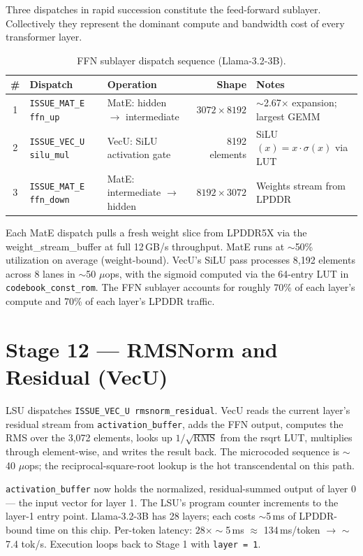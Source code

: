 \documentclass[11pt,letterpaper]{article}
\begin{document}
Three dispatches in rapid succession constitute the feed-forward sublayer. Collectively they
represent the dominant compute and bandwidth cost of every transformer layer.

\begin{table}[h!]
\centering
\small
\begin{tabular}{@{}c l l r p{5cm}@{}}
\toprule
\textbf{\#} & \textbf{Dispatch} & \textbf{Operation} & \textbf{Shape} & \textbf{Notes} \\
\midrule
1 & \texttt{ISSUE\_MAT\_E ffn\_up}   & MatE: hidden $\to$ intermediate & $3072 \times 8192$ & $\sim$2.67$\times$ expansion; largest GEMM \\
2 & \texttt{ISSUE\_VEC\_U silu\_mul} & VecU: SiLU activation gate      & 8192 elements      & SiLU$(x) = x \cdot \sigma(x)$ via LUT \\
3 & \texttt{ISSUE\_MAT\_E ffn\_down} & MatE: intermediate $\to$ hidden & $8192 \times 3072$ & Weights stream from LPDDR \\
\bottomrule
\end{tabular}
\caption{FFN sublayer dispatch sequence (Llama-3.2-3B).}
\end{table}

Each MatE dispatch pulls a fresh weight slice from LPDDR5X via the weight\_stream\_buffer at
full 12\,GB/s throughput. MatE runs at $\sim$50\% utilization on average (weight-bound).
VecU's SiLU pass processes 8{,}192 elements across 8 lanes in $\sim$50 $\mu$ops, with the
sigmoid computed via the 64-entry LUT in \texttt{codebook\_const\_rom}. The FFN sublayer
accounts for roughly 70\% of each layer's compute and 70\% of each layer's LPDDR traffic.

\section{Stage 12 --- RMSNorm and Residual (VecU)}

LSU dispatches \texttt{ISSUE\_VEC\_U rmsnorm\_residual}. VecU reads the current layer's
residual stream from \texttt{activation\_buffer}, adds the FFN output, computes the RMS over
the 3{,}072 elements, looks up $1/\sqrt{\text{RMS}}$ from the rsqrt LUT, multiplies through
element-wise, and writes the result back. The microcoded sequence is $\sim$40 $\mu$ops; the
reciprocal-square-root lookup is the hot transcendental on this path.

\texttt{activation\_buffer} now holds the normalized, residual-summed output of layer 0 ---
the input vector for layer 1. The LSU's program counter increments to the layer-1 entry
point. Llama-3.2-3B has 28 layers; each costs $\sim$5\,ms of LPDDR-bound time on this chip.
Per-token latency: $28 \times \sim$5\,ms $\approx$ 134\,ms/token $\to$ $\sim$7.4 tok/s.
Execution loops back to Stage 1 with \texttt{layer = 1}.
\end{document}
